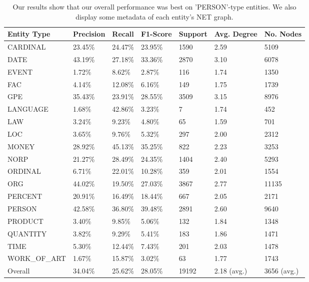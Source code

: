 \documentclass[11pt,a4paper]{article}
\begin{document}
\begin{table}[ht]
\begin{tabular}{lllllll}
\toprule
Entity Type   & Precision & Recall  & F1-Score & Support  & Avg. Degree & No. Nodes \\ \midrule
CARDINAL      & 23.45\%   & 24.47\% & 23.95\%  & 1590     & 2.59        & 5109       \\
DATE          & 43.19\%   & 27.18\% & 33.36\%  & 2870     & 3.10        & 6078    \\
EVENT         & 1.72\%    & 8.62\%  & 2.87\%   & 116      & 1.74        & 1350   \\
FAC           & 4.14\%    & 12.08\% & 6.16\%   & 149      & 1.75        & 1739 \\
GPE           & 35.43\%   & 23.91\% & 28.55\%  & 3509     & 3.15        & 8976    \\
LANGUAGE      & 1.68\%    & 42.86\% & 3.23\%   & 7        & 1.74        & 452      \\
LAW           & 3.24\%    & 9.23\%  & 4.80\%   & 65       & 1.59        & 701 \\
LOC           & 3.65\%    & 9.76\%  & 5.32\%   & 297      & 2.00        & 2312 \\
MONEY         & 28.92\%   & 45.13\% & 35.25\%  & 822      & 2.23        & 3253     \\
NORP          & 21.27\%   & 28.49\% & 24.35\%  & 1404     & 2.40        & 5293    \\
ORDINAL       & 6.71\%    & 22.01\% & 10.28\%  & 359      & 2.01        & 1554     \\
ORG           & 44.02\%   & 19.50\% & 27.03\%  & 3867     & 2.77        & 11135    \\
PERCENT       & 20.91\%   & 16.49\% & 18.44\%  & 667      & 2.05        & 2171 \\
PERSON        & 42.58\%   & 36.80\% & 39.48\%  & 2891     & 2.60        & 9640    \\
PRODUCT       & 3.40\%    & 9.85\%  & 5.06\%   & 132      & 1.84        & 1348 \\
QUANTITY      & 3.82\%    & 9.29\%  & 5.41\%   & 183      & 1.86        & 1471 \\
TIME          & 5.30\%    & 12.44\% & 7.43\%   & 201      & 2.03        & 1478 \\
WORK\_OF\_ART & 1.67\%    & 15.87\% & 3.02\%   & 63       & 1.77        & 1743 \\ \midrule
Overall       & 34.04\%   & 25.62\% & 28.05\%  & 19192    & 2.18 (avg.)  & 3656 (avg.)
\end{tabular}
\caption{Our results show that our overall performance was best on 'PERSON'-type entities. We also display some metadata of each entity's NET graph.}
\label{outcomes}
\end{table}
\end{document}
